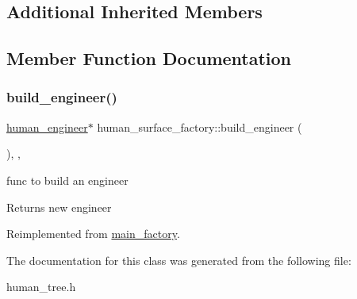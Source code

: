 \subsection*{Additional Inherited Members}


\subsection{Member Function Documentation}
\mbox{\label{classhuman__surface__factory_a9ededd3065e7550d90fe7038daf96564}} 
\subsubsection{\texorpdfstring{build\+\_\+engineer()}{build\_engineer()}}
{\footnotesize\ttfamily \mbox{\hyperlink{classhuman__engineer}{human\+\_\+engineer}}$\ast$ human\+\_\+surface\+\_\+factory\+::build\+\_\+engineer (\begin{DoxyParamCaption}{ }\end{DoxyParamCaption})\hspace{0.3cm}{\ttfamily [inline]}, {\ttfamily [override]}, {\ttfamily [virtual]}}

func to build an engineer \begin{DoxyReturn}{Returns}
new engineer 
\end{DoxyReturn}


Reimplemented from \mbox{\hyperlink{classmain__factory_ac970fe346638331722123f2bb240b590}{main\+\_\+factory}}.



The documentation for this class was generated from the following file\+:\begin{DoxyCompactItemize}
\item 
human\+\_\+tree.\+h\end{DoxyCompactItemize}
